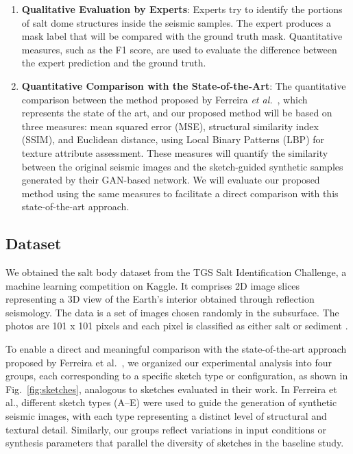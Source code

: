 \documentclass{ieeeaccess}
\begin{document}
\begin{enumerate}
    \item \textbf{Qualitative Evaluation by Experts}: Experts try to identify the portions of salt dome structures inside the seismic samples. The expert produces a mask label that will be compared with the ground truth mask. Quantitative measures, such as the F1 score, are used to evaluate the difference between the expert prediction and the ground truth. 
    
    \item \textbf{Quantitative Comparison with the State-of-the-Art}:
    The quantitative comparison between the method proposed by Ferreira \emph{et al.}~\cite{Ferreira2020}, which represents the state of the art, and our proposed method will be based on three measures: mean squared error (MSE), structural similarity index (SSIM), and Euclidean distance, using Local Binary Patterns (LBP) for texture attribute assessment. These measures will quantify the similarity between the original seismic images and the sketch-guided synthetic samples generated by their GAN-based network. We will evaluate our proposed method using the same measures to facilitate a direct comparison with this state-of-the-art approach.   
\end{enumerate}

\subsection{Dataset}

We obtained the salt body dataset from the TGS Salt Identification Challenge, a machine learning competition on Kaggle. It comprises 2D image slices representing a 3D view of the Earth's interior obtained through reflection seismology. The data is a set of images chosen randomly in the subsurface. The photos are 101 x 101 pixels and each pixel is classified as either salt or sediment \cite{TGS2023}.

To enable a direct and meaningful comparison with the state-of-the-art approach proposed by Ferreira et al.~\cite{Ferreira2020}, we organized our experimental analysis into four groups, each corresponding to a specific sketch type or configuration, as shown in Fig.~\ref{fig:sketches}, analogous to sketches evaluated in their work. In Ferreira et al., different sketch types (A--E) were used to guide the generation of synthetic seismic images, with each type representing a distinct level of structural and textural detail. Similarly, our groups reflect variations in input conditions or synthesis parameters that parallel the diversity of sketches in the baseline study. 
\end{document}
